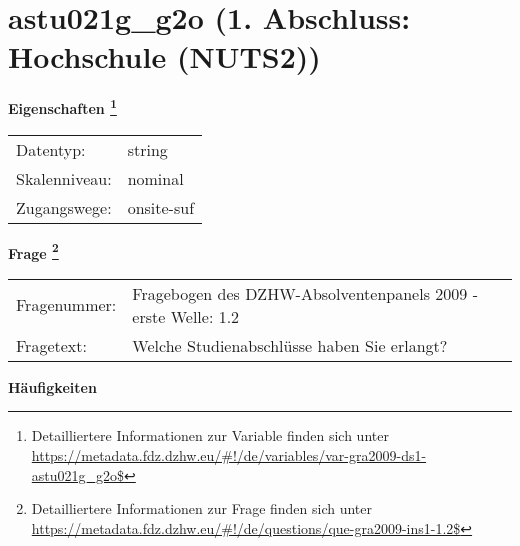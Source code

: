 
    \setcounter{footnote}{0}

    \vspace*{-1.8cm}
	\section{astu021g\_g2o (1. Abschluss: Hochschule (NUTS2))}
	\label{section:astu021g_g2o}



    \vspace*{0.5cm}
    \noindent\textbf{Eigenschaften
	\footnote{Detailliertere Informationen zur Variable finden sich unter
		\url{https://metadata.fdz.dzhw.eu/\#!/de/variables/var-gra2009-ds1-astu021g_g2o$}}}\\
	\begin{tabularx}{\hsize}{@{}lX}
	Datentyp: & string \\
	Skalenniveau: & nominal \\
	Zugangswege: &
	  onsite-suf
 \\
    \end{tabularx}



				\vspace*{0.5cm}
                \noindent\textbf{Frage
	                \footnote{Detailliertere Informationen zur Frage finden sich unter
		              \url{https://metadata.fdz.dzhw.eu/\#!/de/questions/que-gra2009-ins1-1.2$}}}\\
				\begin{tabularx}{\hsize}{@{}lX}
					Fragenummer: &
					  Fragebogen des DZHW-Absolventenpanels 2009 - erste Welle:
					  1.2
 \\
					Fragetext: & Welche Studienabschlüsse haben Sie erlangt? \\
				\end{tabularx}





        		\vspace*{0.5cm}
                \noindent\textbf{Häufigkeiten}

